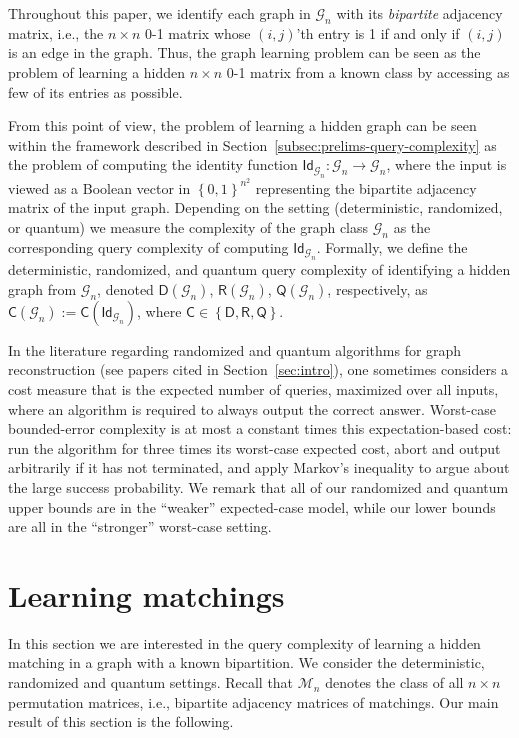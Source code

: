\documentclass[11pt]{article}
\newcommand{\cG}{\mathcal{G}}
\newcommand{\cM}{\mathcal{M}}
\newcommand{\sC}{\mathsf{C}}
\newcommand{\sD}{\mathsf{D}}
\newcommand{\sQ}{\mathsf{Q}}
\newcommand{\sR}{\mathsf{R}}
\newcommand{\set}[1]{\left\{ #1 \right\}}
\newcommand{\cbra}[1]{\left\{#1\right\}}
\newcommand{\zone}{\set{0,1}}
\begin{document}
Throughout this paper, we identify each graph in $\cG_n$ with its \emph{bipartite} adjacency matrix, i.e., the $n \times n$ 0-1 matrix whose $(i,j)$'th entry is 1 if and only if $(i,j)$ is an edge in the graph. Thus, the graph learning problem can be seen as the problem of learning a hidden $n \times n$ 0-1 matrix from a known class by accessing as few of its entries as possible.

From this point of view, the problem of learning a hidden graph can be seen within the framework described in Section~\ref{subsec:prelims-query-complexity} as the problem of computing the identity function $\mathsf{Id}_{\cG_n} : \cG_n \to \cG_n$, where the input is viewed as a Boolean vector in $\zone^{n^2}$ representing the bipartite adjacency matrix of the input graph.
Depending on the setting (deterministic, randomized, or quantum) we measure the complexity of the graph class $\cG_n$ as the corresponding query complexity of computing $\mathsf{Id}_{\cG_n}$.
Formally, we define the deterministic, randomized, and quantum query complexity of identifying a hidden graph from $\cG_n$, denoted $\sD(\cG_n)$, $\sR(\cG_n)$, $\sQ(\cG_n)$, respectively, as $\sC(\cG_n) := \sC(\mathsf{Id}_{\cG_n})$, where $\sC \in \cbra{\sD, \sR, \sQ}$.

In the literature regarding randomized and quantum algorithms for graph reconstruction (see papers cited in Section~\ref{sec:intro}), one sometimes considers a cost measure that is the expected number of queries, maximized over all inputs, where an algorithm is required to always output the correct answer.
Worst-case bounded-error complexity is at most a constant times this expectation-based cost: run the algorithm for three times its worst-case expected cost, abort and output arbitrarily if it has not terminated, and apply Markov's inequality to argue about the large success probability.
We remark that all of our randomized and quantum upper bounds are in the ``weaker'' expected-case model, while our lower bounds are all in the ``stronger'' worst-case setting.





\section{Learning matchings}\label{sec:matching}
In this section we are interested in the query complexity of learning a hidden matching in a graph with a known bipartition. We consider the deterministic, randomized and quantum settings.
%
Recall that $\cM_n$ denotes the class of all $n \times n$ permutation matrices, i.e., bipartite adjacency matrices of matchings. Our main result of this section is the following.
\end{document}

